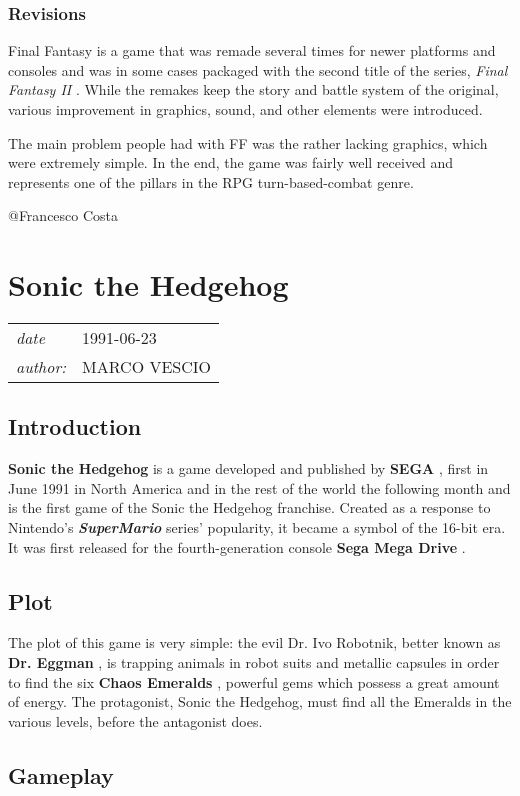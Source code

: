 \documentclass[a4paper,10pt]{book}
\newcommand{\pageHeader}[4]{
    \section{#1}
    \vspace{-0.3cm}
    \begin{table}[h!]
     \begin{tabular}{ll}
        \hline
        \textit{date} & #2 \\
        \textit{author: } & #3\\
        \hline
     \end{tabular}
    \end{table}
    \vspace{-0.3cm}
}
\begin{document}
 
 \subsubsection{Revisions }
 
          Final Fantasy is a game that was remade several times for newer platforms
          and consoles and was in some cases packaged with the second title of the
          series,  \textit{Final Fantasy II }. While the remakes keep the story and battle
          system of the original, various improvement in graphics, sound, and other
          elements were introduced.
           
          The main problem people had with FF was the rather lacking graphics, which were
          extremely simple. In the end, the game was fairly well received and represents
          one of the pillars in the RPG turn-based-combat genre.
         
 
 
 @Francesco Costa 
 
 \newpage\pageHeader{Sonic the Hedgehog}{1991-06-23}{MARCO VESCIO}{A webpage about the first Sonic game}
 \subsection{Introduction }
 
 \textbf{Sonic the Hedgehog }  is a game developed and published by  \textbf{SEGA } , first in June 1991 in North America and in the rest of the world the following month and is the first game of the Sonic the Hedgehog franchise. 
          Created as a response to Nintendo's  \textbf{\textit{SuperMario }}  series' popularity, it became a symbol of the 16-bit era. It was first released for the fourth-generation console  \textbf{Sega Mega Drive } .
         
 \subsection{Plot }
 
          The plot of this game is very simple: the evil Dr. Ivo Robotnik, better known as  \textbf{Dr. Eggman } , is trapping animals in robot suits and metallic capsules in order to find the six  \textbf{Chaos Emeralds } , powerful gems which possess a great amount of energy. The protagonist, Sonic the Hedgehog, must find all the Emeralds in the various levels, before the antagonist does.
         
 \subsection{Gameplay }
 
\end{document}
